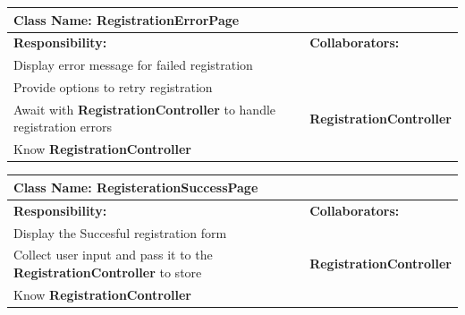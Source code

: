 \documentclass[]{article}
\begin{document}
\begin{table}[H]
    \centering
    \begin{tabular}{|p{5cm}|p{5cm}|}
        \hline 
         \multicolumn{2}{|l|}{\textbf{Class Name:} RegistrationErrorPage} \\
        \hline
        \textbf{Responsibility:} & \textbf{Collaborators:} \\
        \hline
        Display error message for failed registration &  \phantom{} \\
        \hline
        Provide options to retry registration & \phantom{} \\
        \hline
        Await with \textbf{RegistrationController} to handle registration errors & \textbf{RegistrationController} \\
        \hline
        Know \textbf{RegistrationController} & \phantom{} \\
        \hline
        \end{tabular}
    \end{table}

\begin{table}[H]
        \centering
        \begin{tabular}{|p{5cm}|p{5cm}|}
        \hline 
         \multicolumn{2}{|l|}{\textbf{Class Name:} RegisterationSuccessPage} \\
        \hline
        \textbf{Responsibility:} & \textbf{Collaborators:} \\
        \hline
        Display the Succesful registration form &  \phantom{} \\
        \hline
         Collect user input and pass it to the \textbf{RegistrationController} to store & \textbf{RegistrationController} \\ 
        \hline
        Know \textbf{RegistrationController} & \phantom{} \\
        \hline
        \end{tabular}
    \end{table}
    
\end{document}
